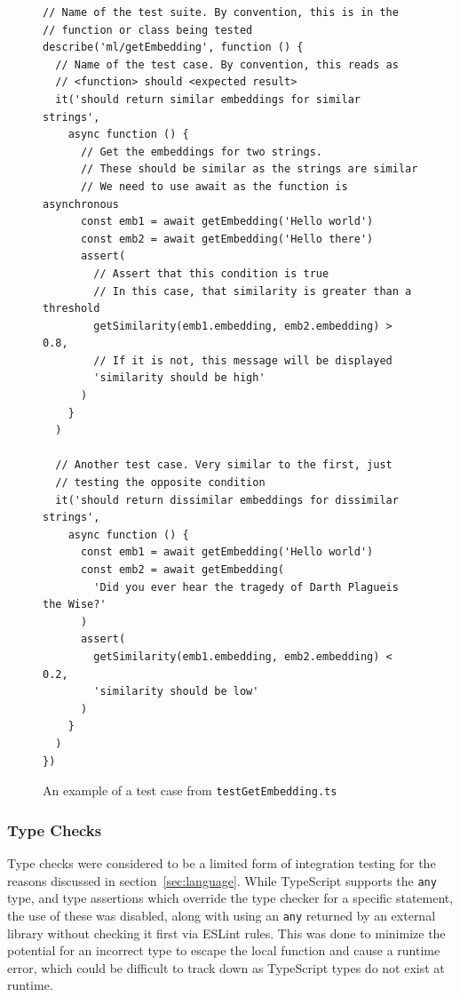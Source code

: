 \begin{figure}[p]
    \caption{\label{fig:test_case}An example of a test case from \texttt{testGetEmbedding.ts}}
    \begin{verbatim}
// Name of the test suite. By convention, this is in the
// function or class being tested
describe('ml/getEmbedding', function () {
  // Name of the test case. By convention, this reads as
  // <function> should <expected result>
  it('should return similar embeddings for similar strings',
    async function () {
      // Get the embeddings for two strings.
      // These should be similar as the strings are similar
      // We need to use await as the function is asynchronous
      const emb1 = await getEmbedding('Hello world')
      const emb2 = await getEmbedding('Hello there')
      assert(
        // Assert that this condition is true
        // In this case, that similarity is greater than a threshold
        getSimilarity(emb1.embedding, emb2.embedding) > 0.8,
        // If it is not, this message will be displayed
        'similarity should be high'
      )
    }
  )

  // Another test case. Very similar to the first, just
  // testing the opposite condition
  it('should return dissimilar embeddings for dissimilar strings',
    async function () {
      const emb1 = await getEmbedding('Hello world')
      const emb2 = await getEmbedding(
        'Did you ever hear the tragedy of Darth Plagueis the Wise?'
      )
      assert(
        getSimilarity(emb1.embedding, emb2.embedding) < 0.2,
        'similarity should be low'
      )
    }
  )
})
    \end{verbatim}
\end{figure}

\subsubsection{Type Checks}
Type checks were considered to be a limited form of integration testing for the reasons discussed in section~\ref{sec:language}.
While TypeScript supports the \texttt{any} type, and type assertions which override the type checker for a specific statement,
the use of these was disabled, along with using an \texttt{any} returned by an external library without checking it first via
ESLint rules. This was done to minimize the potential for an incorrect type to escape the local function and cause a runtime error,
which could be difficult to track down as TypeScript types do not exist at runtime.~\cite{dan_vanderkam_1_2019}

